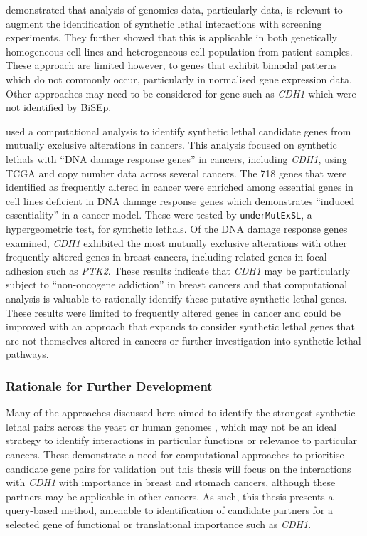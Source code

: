 \citet{Wappett2016} demonstrated that analysis of \glspl{genomic} data, particularly  data, is relevant to augment the identification of \gls{synthetic lethal} interactions with screening experiments. They further showed that this is applicable in both genetically homogeneous cell lines and heterogeneous cell population from patient samples. These approach are limited however, to genes that exhibit bimodal  patterns which do not commonly occur, particularly in normalised \gls{gene expression} data. Other approaches may need to be considered for gene such as \textit{CDH1} which were not identified by \gls{BiSEp}.

\citet{Srihari2015} used a computational analysis to identify \gls{synthetic lethal} candidate genes from mutually exclusive alterations in cancers. This analysis focused on \glspl{synthetic lethal} with ``\acrshort{DNA} damage response genes'' in cancers, including \textit{CDH1}, using \gls{TCGA}  and copy number data across several cancers. The 718 genes that were identified as frequently altered in cancer were enriched among essential genes in cell lines deficient in \acrshort{DNA} damage response genes which demonstrates ``induced essentiality'' in a cancer model. These were tested by \texttt{underMutExSL}, a hypergeometric test, for \glspl{synthetic lethal}.  Of the \acrshort{DNA} damage response genes examined, \textit{CDH1} exhibited the most mutually exclusive alterations with other frequently altered genes in breast cancers, including related genes in focal adhesion such as \textit{PTK2}. These results indicate that \textit{CDH1} may be particularly subject to ``\gls{non-oncogene addiction}'' in breast cancers and that computational analysis is valuable to rationally identify these putative \gls{synthetic lethal} genes. These results were limited to frequently altered genes in cancer and could be improved with an approach that expands to consider \gls{synthetic lethal} genes that are not themselves altered in cancers or further investigation into \gls{synthetic lethal} pathways.

\subsubsection{Rationale for Further Development}

Many of the approaches discussed here aimed to identify the strongest \gls{synthetic lethal} pairs across the yeast or human \glspl{genome} \citep{Lu2015, Wappett2016, Deshpande2013, Wu2014}, which may not be an ideal strategy to identify interactions in particular functions or relevance to particular cancers. These demonstrate a need for computational approaches to prioritise candidate gene pairs for validation but this thesis will focus on the interactions with \textit{CDH1} with importance in breast and stomach cancers, although these partners may be applicable in other cancers. As such, this thesis presents a query-based method, amenable to identification of candidate partners for a selected gene of functional or translational importance such as \textit{CDH1}.

